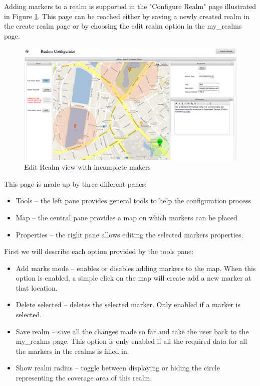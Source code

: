 \noindent Adding markers to a realm is supported in the "Configure Realm" page illustrated in Figure \ref{fig.edit_realm1}. This page can be reached either by saving a newly created realm in the create realm page or by choosing the edit realm option in the my\_realms page.
\begin{figure}[H] 
	\centering
	\includegraphics[width=\linewidth]{fig/edit_realm1.png}
	\caption{Edit Realm view with incomplete makers}
	\label{fig.edit_realm1}
\end{figure}
\noindent This page is made up by three different panes:
\begin{itemize}
	\item Tools -- the left pane provides general tools to help the configuration process
 	\item Map -- the central pane provides a map on which markers can be placed
	\item Properties -- the right pane allows editing the selected markers properties.
\end{itemize}

\noindent First we will describe each option provided by the tools pane:
\begin{itemize}
	\item Add marks mode -- enables or disables adding markers to the map. When this option is enabled, a simple click on the map will create add a new marker at that location.
	\item Delete selected -- deletes the selected marker. Only enabled if a marker is selected.
	\item Save realm -- save all the changes made so far and take the user back to the my\_realms page. This option is only enabled if all the required data for all the markers in the realms is filled in.
	\item Show realm radius -- toggle between displaying or hiding the circle representing the coverage area of this realm.
\end{itemize}

